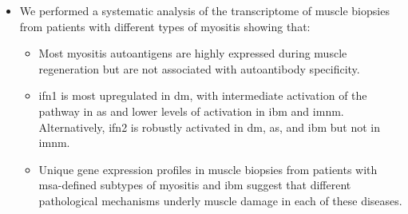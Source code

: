 \begin{itemize}
	\item We performed a systematic analysis of the transcriptome of muscle biopsies from patients with different types of myositis showing that:
	\begin{itemize}
		\item Most myositis autoantigens are highly expressed during muscle regeneration but are not associated with autoantibody specificity.
		
		\item \gls{ifn}1 is most upregulated in \gls{dm}, with intermediate activation of the pathway in \gls{as} and lower levels of activation in \gls{ibm} and \gls{imnm}. Alternatively, \gls{ifn}2 is robustly activated in \gls{dm}, \gls{as}, and \gls{ibm} but not in \gls{imnm}.
		
		\item Unique gene expression profiles in muscle biopsies from patients with \gls{msa}-defined subtypes of myositis and \gls{ibm} suggest that different pathological mechanisms underly muscle damage in each of these diseases.
	\end{itemize}
\end{itemize}
